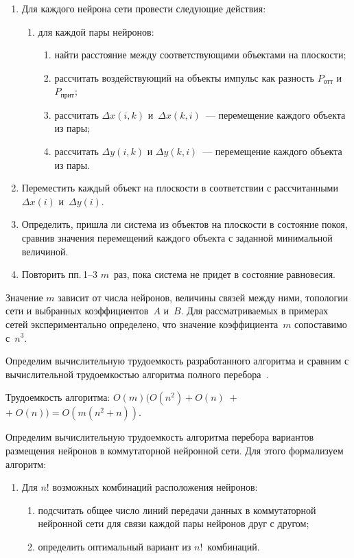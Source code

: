 \begin{multicols}{2}
     \noindent
     \begin{enumerate}[1.]
     \item Для каждого нейрона сети провести следующие действия:
     \begin{enumerate}[{1.}1]
     \item для каждой пары нейронов:
     \begin{enumerate}[{1.1.}1]
     \item найти расстояние между соответствующими объектами на 
плос\-кости;
     \item  рассчитать воздействующий на объекты импульс как разность 
$P_{\mathrm{отт}}$ и~$P_{\mathrm{прит}}$;
     \item рассчитать $\Delta x(i,k)$ и~$\Delta x(k,i)$~--- перемещение 
каждого объекта из \mbox{пары};
     \item рассчитать $\Delta y(i,k)$ и $\Delta y(k,i)$~--- перемещение 
каждого объекта из \mbox{пары}.
     \end{enumerate}
     \end{enumerate}
     \item Переместить каждый объект на плоскости в соответствии с 
рассчитанными~$\Delta x(i)$ и~$\Delta y(i)$.
     \item Определить, пришла ли система из объектов на плоскости в 
состояние покоя, сравнив значения перемещений каждого объекта с заданной 
минимальной величиной.
     \item Повторить пп.\,1--3 $m$~раз, пока система не придет в состояние 
равновесия.
     \end{enumerate}
     
     Значение $m$ зависит от числа нейронов, величины связей между 
ними, топологии сети и выбранных коэффициентов~$A$ и~$B$. Для 
рассматриваемых в примерах сетей экспериментально определено, что 
значение коэффициента~$m$ сопоставимо с~$n^3$.
     
     Определим вычислительную трудоемкость разработанного алгоритма и 
сравним с вычислительной трудоемкостью алгоритма полного 
перебора~\cite{9step}.
     
     Трудоемкость алгоритма: $O(m)(O(n^2)+O(n)\;+$\linebreak $+\;O(n)) = O(m(n^2+n))$.
     
     Определим вычислительную трудоемкость алгоритма перебора 
вариантов размещения нейронов в коммутаторной нейронной сети. Для этого 
формализуем алгоритм:
     \begin{enumerate}[1.]
     \item Для $n!$ возможных комбинаций расположения нейронов:
     \begin{enumerate}[{1.}1]
     \item  подсчитать общее число линий передачи данных в 
коммутаторной нейронной сети для связи каждой пары нейронов друг с 
другом;
     \item определить оптимальный вариант из $n!$~комбинаций.
     \end{enumerate}
     \end{enumerate}
     

\end{multicols}
